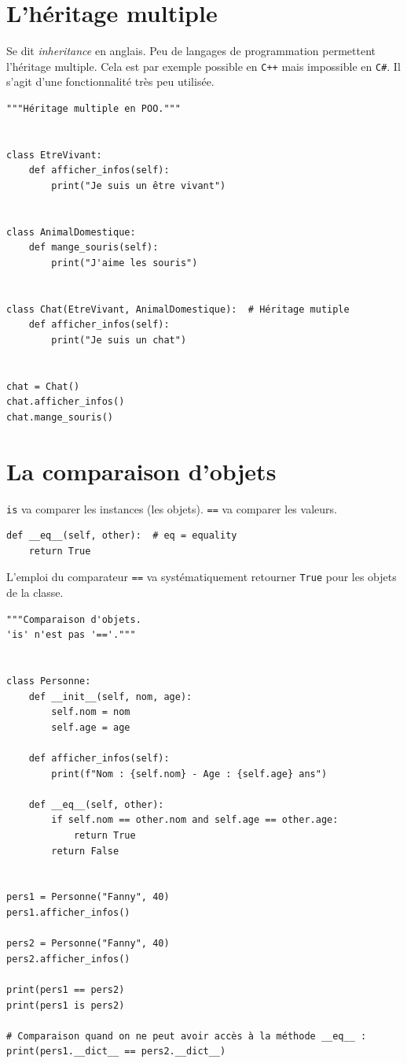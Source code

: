 \documentclass[a4paper,12pt]{book}
\begin{document}
\section{L'héritage multiple}
Se dit \textit{inheritance} en anglais. Peu de langages de programmation permettent l'héritage multiple. Cela est par exemple possible en \texttt{C++} mais impossible en \texttt{C\#}. Il s'agit d'une fonctionnalité très peu utilisée.
\medskip

\begin{lstlisting}
"""Héritage multiple en POO."""


class EtreVivant:
    def afficher_infos(self):
        print("Je suis un être vivant")


class AnimalDomestique:
    def mange_souris(self):
        print("J'aime les souris")


class Chat(EtreVivant, AnimalDomestique):  # Héritage mutiple
    def afficher_infos(self):
        print("Je suis un chat")


chat = Chat()
chat.afficher_infos()
chat.mange_souris()
\end{lstlisting}
\medskip

\section{La comparaison d'objets}
\texttt{is} va comparer les instances (les objets). \texttt{==} va comparer les valeurs.
\begin{lstlisting}
def __eq__(self, other):  # eq = equality
    return True
\end{lstlisting}
\medskip

L'emploi du comparateur \texttt{==} va systématiquement retourner \texttt{True} pour les objets de la classe.
\begin{lstlisting}
"""Comparaison d'objets.
'is' n'est pas '=='."""


class Personne:
    def __init__(self, nom, age):
        self.nom = nom
        self.age = age

    def afficher_infos(self):
        print(f"Nom : {self.nom} - Age : {self.age} ans")

    def __eq__(self, other):
        if self.nom == other.nom and self.age == other.age:
            return True
        return False


pers1 = Personne("Fanny", 40)
pers1.afficher_infos()

pers2 = Personne("Fanny", 40)
pers2.afficher_infos()

print(pers1 == pers2)
print(pers1 is pers2)

# Comparaison quand on ne peut avoir accès à la méthode __eq__ :
print(pers1.__dict__ == pers2.__dict__)
\end{lstlisting}
\medskip
\end{document}
